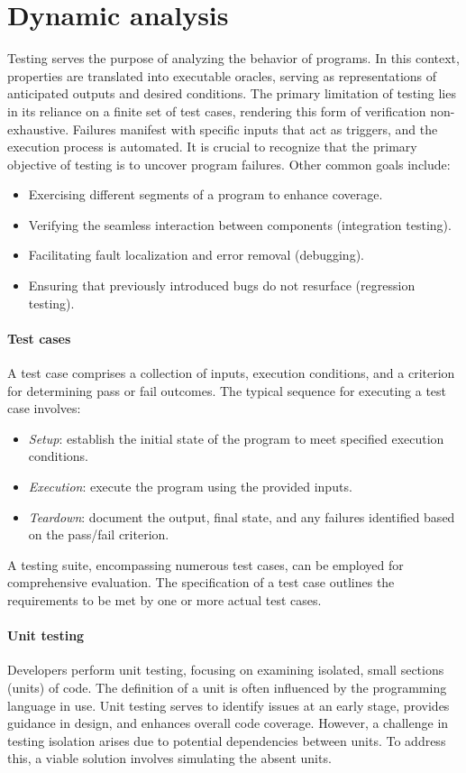 \section{Dynamic analysis}

Testing serves the purpose of analyzing the behavior of programs.
In this context, properties are translated into executable oracles, serving as representations of anticipated outputs and desired conditions.
The primary limitation of testing lies in its reliance on a finite set of test cases, rendering this form of verification non-exhaustive. 
Failures manifest with specific inputs that act as triggers, and the execution process is automated.
It is crucial to recognize that the primary objective of testing is to uncover program failures. 
Other common goals include:
\begin{itemize}
    \item Exercising different segments of a program to enhance coverage.
    \item Verifying the seamless interaction between components (integration testing).
    \item Facilitating fault localization and error removal (debugging).
    \item Ensuring that previously introduced bugs do not resurface (regression testing).
\end{itemize}

\paragraph*{Test cases}
A test case comprises a collection of inputs, execution conditions, and a criterion for determining pass or fail outcomes.
The typical sequence for executing a test case involves:
\begin{itemize}
    \item \textit{Setup}: establish the initial state of the program to meet specified execution conditions.
    \item \textit{Execution}: execute the program using the provided inputs.
    \item \textit{Teardown}: document the output, final state, and any failures identified based on the pass/fail criterion.
\end{itemize}
A testing suite, encompassing numerous test cases, can be employed for comprehensive evaluation. 
The specification of a test case outlines the requirements to be met by one or more actual test cases.

\paragraph*{Unit testing}
Developers perform unit testing, focusing on examining isolated, small sections (units) of code. 
The definition of a unit is often influenced by the programming language in use. 
Unit testing serves to identify issues at an early stage, provides guidance in design, and enhances overall code coverage.
However, a challenge in testing isolation arises due to potential dependencies between units. 
To address this, a viable solution involves simulating the absent units.

